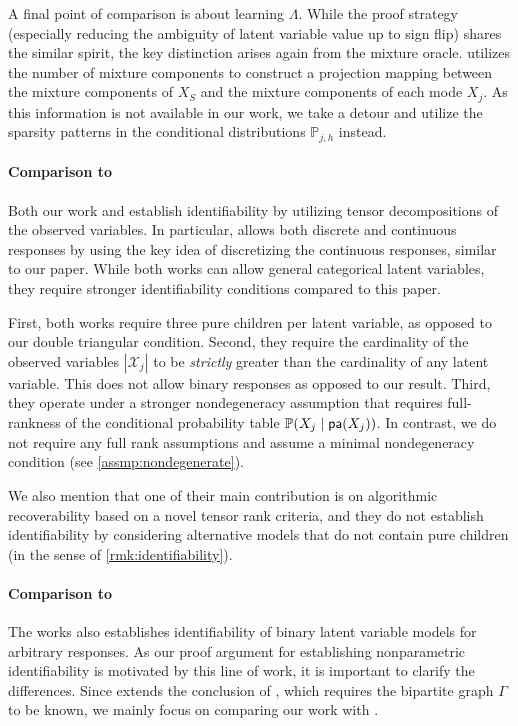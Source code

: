 \documentclass[10pt]{article} %
\newcommand{\PP}{\mathbb P}
\newcommand{\pa}{\textsf{\upshape pa}}
\begin{document}
A final point of comparison is about learning $\Lambda$. %
While the proof strategy (especially reducing the ambiguity of latent variable value up to sign flip) shares the similar spirit, the key distinction arises again from the mixture oracle. \cite{kivva2021learning} utilizes the number of mixture components to construct a projection mapping between the mixture components of $X_S$ and the mixture components of each mode $X_j$. 
%
As this information is not available in our work, we take a detour and utilize the sparsity patterns in the conditional distributions $\PP_{j,h}$ instead.

\paragraph{Comparison to \cite{chen2024learning,chen2025identification}} Both our work and \cite{chen2024learning,chen2025identification} establish identifiability by utilizing tensor decompositions of the observed variables. {In particular, \cite{chen2025identification} allows both discrete and continuous responses by using the key idea of discretizing the continuous responses, similar to our paper.} While both works can allow general categorical latent variables, they require stronger identifiability conditions compared to this paper.

First, both works require three pure children per latent variable, as opposed to our double triangular condition. Second, they require the cardinality of the observed variables $|\mathcal{X}_j|$ to be \emph{strictly} greater than the cardinality of any latent variable. This does not allow binary responses as opposed to our result. Third, they operate under a stronger nondegeneracy assumption that requires full-rankness of the conditional probability table $\PP(X_{j} \mid \pa(X_j))$. In contrast, we do not require any full rank assumptions and assume a minimal nondegeneracy condition (see \cref{assmp:nondegenerate}).

We also mention that one of their main contribution is on algorithmic recoverability based on a novel tensor rank criteria, and they do not establish identifiability by considering alternative models that do not contain pure children (in the sense of \cref{rmk:identifiability}).


\paragraph{Comparison to \cite{lee2025deep}} The works \cite{lee2024new, lee2025deep} also establishes identifiability of binary latent variable models for arbitrary responses. As our proof argument for establishing nonparametric identifiability is motivated by this line of work, it is important to clarify the differences. Since \cite{lee2025deep} extends the conclusion of \cite{lee2024new}, which requires the bipartite graph $\Gamma$ to be known, we mainly focus on comparing our work with \cite{lee2025deep}.
\end{document}
